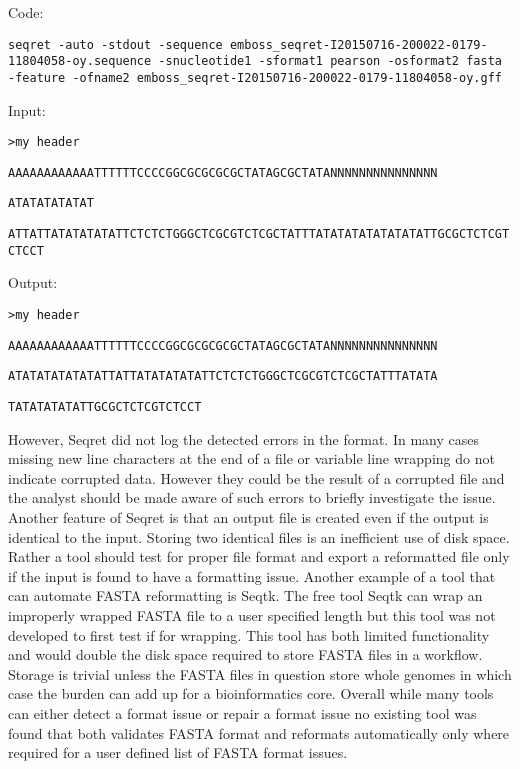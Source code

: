 Code:

\verb|seqret -auto -stdout -sequence emboss_seqret-I20150716-200022-0179-11804058-oy.sequence -snucleotide1 -sformat1 pearson -osformat2 fasta -feature -ofname2 emboss_seqret-I20150716-200022-0179-11804058-oy.gff|

Input:

\verb|>my header|

\verb|AAAAAAAAAAAATTTTTTCCCCGGCGCGCGCGCTATAGCGCTATANNNNNNNNNNNNNNN|

\verb|ATATATATATAT|

\verb|ATTATTATATATATATTCTCTCTGGGCTCGCGTCTCGCTATTTATATATATATATATATTGCGCTCTCGTCTCCT|

Output:

\verb|>my header|

\verb|AAAAAAAAAAAATTTTTTCCCCGGCGCGCGCGCTATAGCGCTATANNNNNNNNNNNNNNN|

\verb|ATATATATATATATTATTATATATATATTCTCTCTGGGCTCGCGTCTCGCTATTTATATA|

\verb|TATATATATATTGCGCTCTCGTCTCCT|

However, Seqret did not log the detected errors in the format. In many cases missing new line characters at the end of a file or variable line wrapping do not indicate corrupted data. However they could be the result of a corrupted file and the analyst should be made aware of such errors to briefly investigate the issue. Another feature of Seqret is that an output file is created even if the output is identical to the input. Storing two identical files is an inefficient use of disk space. Rather a tool should test for proper file format and export a reformatted file only if the input is found to have a formatting issue. Another example of a tool that can automate FASTA reformatting is Seqtk. The free tool Seqtk can wrap an improperly wrapped FASTA file to a user specified length but this tool was not developed to first test if for wrapping. This tool has both limited functionality and would double the disk space required to store FASTA files in a workflow. Storage is trivial unless the FASTA files in question store whole genomes in which case the burden can add up for a bioinformatics core. Overall while many tools can either detect a format issue or repair a format issue no existing tool was found that both validates FASTA format and reformats automatically only where required for a user defined list of FASTA format issues.

  
  
  
  
  
  
  
  
  
  
  
  
  
  
  
  
  
  
  
  
  